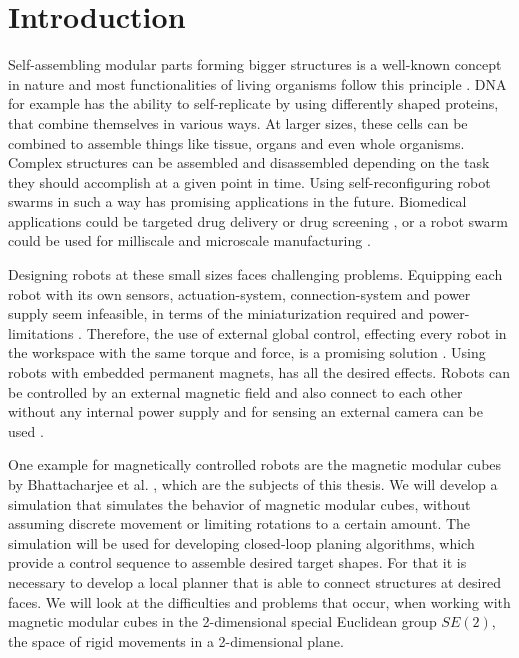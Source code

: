 \chapter{Introduction}
\label{chap:intro}

Self-assembling modular parts forming bigger structures is a well-known concept in nature and most functionalities of living organisms follow this principle \cite{bishop2005}.
DNA for example has the ability to self-replicate by using differently shaped proteins, that combine themselves in various ways.
At larger sizes, these cells can be combined to assemble things like tissue, organs and even whole organisms.
Complex structures can be assembled and disassembled depending on the task they should accomplish at a given point in time. 
Using self-reconfiguring robot swarms in such a way has promising applications in the future.
Biomedical applications could be targeted drug delivery or drug screening \cite{sitti2015}, or a robot swarm could be used for milliscale and microscale manufacturing \cite{pelrine2016}.

Designing robots at these small sizes faces challenging problems.
Equipping each robot with its own sensors, actuation-system, connection-system and power supply seem infeasible, in terms of the miniaturization required and power-limitations \cite{white2007}.
Therefore, the use of external global control, effecting every robot in the workspace with the same torque and force, is a promising solution \cite{white2007}.
Using robots with embedded permanent magnets, has all the desired effects.
Robots can be controlled by an external magnetic field and also connect to each other without any internal power supply and for sensing an external camera can be used \cite{saab2019}.

One example for magnetically controlled robots are the magnetic modular cubes by Bhattacharjee et al. \cite{Bhattacharjee2022}, which are the subjects of this thesis.
We will develop a simulation that simulates the behavior of magnetic modular cubes, without assuming discrete movement or limiting rotations to a certain amount.
The simulation will be used for developing closed-loop planing algorithms, which provide a control sequence to assemble desired target shapes.
For that it is necessary to develop a local planner that is able to connect structures at desired faces.
We will look at the difficulties and problems that occur, when working with magnetic modular cubes in the 2-dimensional special Euclidean group \(SE(2)\), the space of rigid movements in a 2-dimensional plane.


